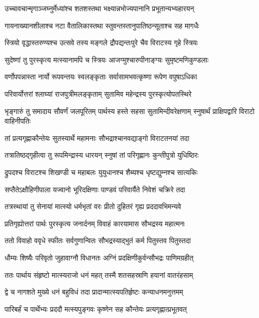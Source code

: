 \twolineshloka
{उच्चावचान्मृगाञ्जघ्नुर्मेध्यांश्च शतशस्तथा}
{भक्ष्यान्नभोज्यपानानि प्रभूतान्यभ्यहारयन्}


\twolineshloka
{गायनाख्यानशीलाश्च नटा वैतालिकास्तथा}
{स्तुवन्तस्तानुपातिष्ठन्सूताश्च सह मागधैः}


\twolineshloka
{स्त्रियो वृद्धास्तरुण्यश्च उत्सवे तस्य मङ्गले}
{द्रौपद्यन्तःपुरे चैव विराटस्य गृहे स्त्रियः}


\twolineshloka
{सुदेष्णां तु पुरस्कृत्य मत्स्यानामपि च स्त्रियः}
{आजग्मुश्चारुपीनाङ्ग्यः सुमृष्टमणिकुण्डलाः}


\twolineshloka
{वर्णोपपन्नास्ता नार्यो रूपवन्तयः स्वलङ्कृताः}
{सर्वासामभवत्कृष्णा रूपेण वपुषाऽधिका}


\twolineshloka
{परिवार्योत्तरां श्लाघ्यां राजपुत्रीमलङ्कृताम्}
{सुतामिव महेन्द्रस्य पुरस्कृत्योपतस्थिरे}


\threelineshloka
{भृङ्गारुं तु समादाय सौवर्णं जलपूरितम्}
{पार्थस्य हस्ते सहसा सुतामिन्दीवरेक्षणाम्}
{स्नुषार्थं प्राक्षिपद्वारि विराटो वाहिनीपतिः}


\twolineshloka
{तां प्रत्यगृह्णाकौन्तेयः सुतस्यार्थे महामनाः}
{सौभद्राश्चानवद्याङ्गो विराटतनयां तदा}


\twolineshloka
{तत्रातिष्ठद्गृहीत्वा तु रूपमिन्द्रास्य धारयन्}
{स्नुषां तां परिगृह्णानः कुन्तीपुत्रो युधिष्ठिरः}


\twolineshloka
{द्रुपदश्च विराटश्च शिखण्डी च महाबलः}
{युयुधानश्च शैब्यश्च धृष्टद्युम्नश्च सात्यकिः}


\twolineshloka
{सप्तैतेऽक्षौहिणीपाला यज्वानो भूरिदक्षिणाः}
{पाण्डवं परिवार्यैते निवेशं चक्रिरे तदा}


\twolineshloka
{तत्रस्थायां तु सेनायां मात्स्यो धर्मभृतां वरः}
{प्रीतो दुहितरं गृह्य प्रददावभिमन्यवे}


\twolineshloka
{प्रतिगृह्योत्तरां पार्थः पुरस्कृत्य जनार्दनम्}
{विवाहं कारयामास सौभद्रस्य महात्मनः}


\twolineshloka
{ततो विवाहो ववृधे स्फीतः सर्वगुणान्वितः}
{सौभद्रस्याद्भुतं कर्म पितुस्तव पितुस्तदा}


\twolineshloka
{धौम्यः शिष्यैः परिवृतो जुहावाग्नौ विधानतः}
{अग्निं प्रदक्षिणीकुर्वन्सौभद्रः पाणिमग्रहीत्}


\twolineshloka
{ततः पार्थाय संहृष्टो मात्स्यराजो धनं महत्}
{तस्मै शतसहस्राणि हयानां वातरंहसाम्}


\twolineshloka
{द्वे च नागशते मुख्ये धनं बहुविधं तदा}
{प्रादान्मात्स्यपतिर्हृष्टः कन्याधनमनुत्तमम्}


\twolineshloka
{पारिबर्हं च पार्थेभ्यः प्रददौ मत्स्यपुङ्गवः}
{कृष्णेन सह कौन्तेयः प्रत्यगृह्णात्प्रभूतवत्}


